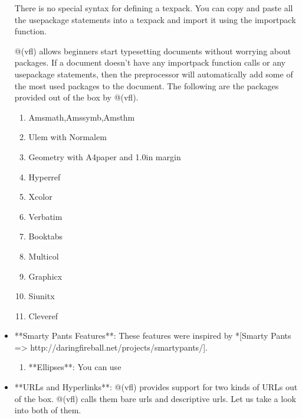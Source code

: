 \documentclass{article}
\begin{document}
\begin{itemize}
There is no special syntax for defining a texpack. You can copy and paste all the usepackage statements into a texpack and import it using the importpack function. 

@(vfl) allows beginners start typesetting documents without worrying about packages. If a document doesn't have any importpack function calls or any usepackage statements, then the preprocessor will automatically add some of the most used packages to the document. The following are the packages provided out of the box by @(vfl).

\begin{enumerate}

\item Amsmath,Amssymb,Amsthm

\item Ulem with Normalem

\item Geometry with A4paper and 1.0in margin

\item Hyperref

\item Xcolor

\item Verbatim

\item Booktabs

\item Multicol

\item Graphicx

\item Siunitx

\item Cleveref

\end{enumerate}

\item **Smarty Pants Features**: These features were inspired by *[Smarty Pants => http://daringfireball.net/projects/smartypants/].

\begin{enumerate}

\item **Ellipses**: You can use %

\end{enumerate}

\item **URLs and Hyperlinks**: @(vfl) provides support for two kinds of URLs out of the box. @(vfl) calls them bare urls and descriptive urls. Let us take a look into both of them.


\end{itemize}
\end{document}
